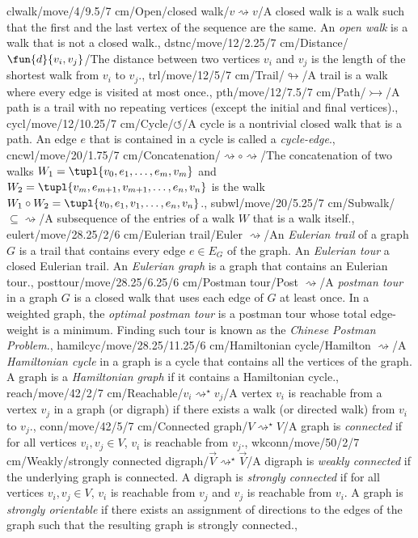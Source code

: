 clwalk/move/4/9.5/7 cm/{Open/closed walk}/{$v\rightsquigarrow v$}/{A closed walk is a walk such that the first and the last vertex of the sequence are the same. An \emph{open walk} is a walk that is not a closed walk.},
dstnc/move/12/2.25/7 cm/{Distance}/{$\fun{d}{v_i,v_j}$}/{The distance between two vertices $v_i$ and $v_j$ is the length of the shortest walk from $v_i$ to $v_j$.},
trl/move/12/5/7 cm/{Trail}/{$\looparrowright$}/{A trail is a walk where every edge is visited at most once.},%
pth/move/12/7.5/7 cm/{Path}/{$\rightarrowtail$}/{A path is a trail with no repeating vertices (except the initial and final vertices).},%
cycl/move/12/10.25/7 cm/{Cycle}/{$\circlearrowleft$}/{A cycle is a nontrivial closed walk that is a path. An edge $e$ that is contained in a cycle is called a \emph{cycle-edge}.},%
cncwl/move/20/1.75/7 cm/{Concatenation}/{$\rightsquigarrow\circ\rightsquigarrow$}/{The concatenation of two walks $W_1=\tupl{v_0,e_1,\ldots,e_m,v_m}$ and $W_2=\tupl{v_m,e_{m+1},v_{m+1},\ldots,e_n,v_n}$ is the walk $W_1\circ W_2=\tupl{v_0,e_1,v_1,\ldots,e_n,v_n}$.},
subwl/move/20/5.25/7 cm/{Subwalk}/{$\subseteq\rightsquigarrow$}/{A subsequence of the entries of a walk $W$ that is a walk itself.},
eulert/move/28.25/2/6 cm/{Eulerian trail}/{Euler $\rightsquigarrow$}/{An \emph{Eulerian trail} of a graph $G$ is a trail that contains every edge $e\in E_G$ of the graph. An \emph{Eulerian tour} a closed Eulerian trail. An \emph{Eulerian graph} is a graph that contains an Eulerian tour.},%
posttour/move/28.25/6.25/6 cm/{Postman tour}/{Post $\rightsquigarrow$}/{A \emph{postman tour} in a graph $G$ is a closed walk that uses each edge of $G$ at least once. In a weighted graph, the \emph{optimal postman tour} is a postman tour whose total edge-weight is a minimum. Finding such tour is known as the \emph{Chinese Postman Problem}.},%
hamilcyc/move/28.25/11.25/6 cm/{Hamiltonian cycle}/{Hamilton $\rightsquigarrow$}/{A \emph{Hamiltonian cycle} in a graph is a cycle that contains all the vertices of the graph. A graph is a \emph{Hamiltonian graph} if it contains a Hamiltonian cycle.},%
reach/move/42/2/7 cm/{Reachable}/{$v_i\rightsquigarrow^{\star} v_j$}/{A vertex $v_i$ is reachable from a vertex $v_j$ in a graph (or digraph) if there exists a walk (or directed walk) from $v_i$ to $v_j$.},
conn/move/42/5/7 cm/{Connected graph}/{$V\rightsquigarrow^{\star}V$}/{A graph is \emph{connected} if for all vertices $v_i,v_j\in V$, $v_i$ is reachable from $v_j$.},
wkconn/move/50/2/7 cm/{Weakly/strongly connected digraph}/{$\vec{V}\rightsquigarrow^{\star}\vec{V}$}/{A digraph is \emph{weakly connected} if the underlying graph is connected. A digraph is \emph{strongly connected} if for all vertices $v_i,v_j\in V$, $v_i$ is reachable from $v_j$ and $v_j$ is reachable from $v_i$. A graph is \emph{strongly orientable} if there exists an assignment of directions to the edges of the graph such that the resulting graph is strongly connected.},
